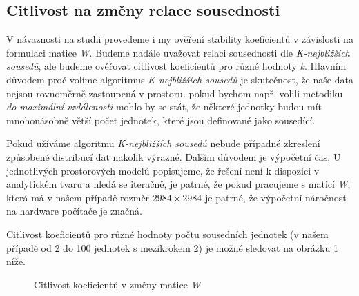 \documentclass[11pt, a4paper]{article}
\begin{document}
\subsection{Citlivost na změny relace sousednosti}

V návaznosti na studii \cite{formanek2016stability} provedeme i my ověření stability koeficientů v závislosti na formulaci matice \textit{W}. Budeme nadále uvažovat relaci sousednosti dle \textit{K-nejbližších sousedů}, ale budeme ověřovat citlivost koeficientů pro různé hodnoty \textit{k}. Hlavním důvodem proč volíme algoritmus \textit{K-nejbližších sousedů} je skutečnost, že naše data nejsou rovnoměrně zastoupená v prostoru. pokud bychom např. volili metodiku \textit{do maximální vzdálenosti} mohlo by se stát, že některé jednotky budou mít mnohonásobně větší počet jednotek, které jsou definované jako sousedící. 

Pokud užíváme algoritmu \textit{K-nejbližších sousedů} nebude případné zkreslení způsobené distribucí dat nakolik výrazné. Dalším důvodem je výpočetní čas. U jednotlivých prostorových modelů popisujeme, že řešení není k dispozici v analytickém tvaru a hledá se iteračně, je patrné, že pokud pracujeme s maticí \textit{W}, která má v našem případě rozměr \textit{$2984 \times 2984$} je patrné, že výpočetní náročnost na hardware počítače je značná.

Citlivost koeficientů pro různé hodnoty počtu sousedních jednotek (v našem případě od 2 do 100 jednotek s mezikrokem 2) je možné sledovat na obrázku \ref{Citlivost koeficientů v změny matice} níže.

\begin{figure}[ht]
    \centering
        \noindent{}
    \caption{Citlivost koeficientů v změny matice \textit{W}}
    \label{Citlivost koeficientů v změny matice}
\end{figure}
\end{document}
